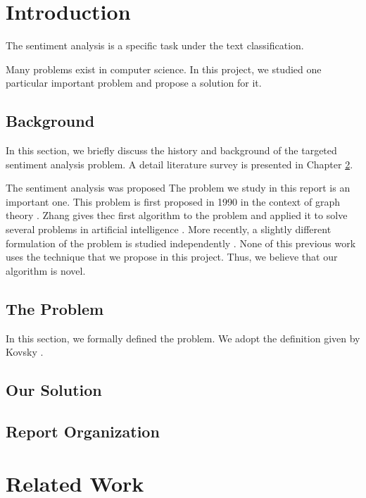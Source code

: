 \documentclass[fyp]{socreport}
\begin{document}
\listoffigures 
\listoftables
\tableofcontents 

\chapter{Introduction}
The sentiment analysis is a specific task under the text classification.




Many problems exist in computer science.  In this project, we 
studied one particular important problem and propose a solution 
for it.  

\section{Background}
In this section, we briefly discuss the history and background
of the targeted sentiment analysis problem.  A detail literature survey is presented in 
Chapter \ref{ch:related}.

The sentiment analysis was proposed
The problem we study in this report is an important one.
This problem is first proposed in 1990 in the context
of graph theory \cite{smith90graph}.  Zhang gives thec
first algorithm to the problem and applied it to solve several 
problems in artificial intelligence \cite{zhang91ai,zhang92ai}.  
More recently, a slightly different formulation of the problem
is studied independently \cite{kovsky92diff,ali94diff}.  None of this previous work
uses the technique that we propose in this project.  Thus, we 
believe that our algorithm is novel.

\section{The Problem}
In this section, we formally defined the problem.  We adopt
the definition given by Kovsky \cite{kovsky92diff}.

\section{Our Solution}
\section{Report Organization}

\chapter{Related Work}
\label{ch:related}
\end{document}
